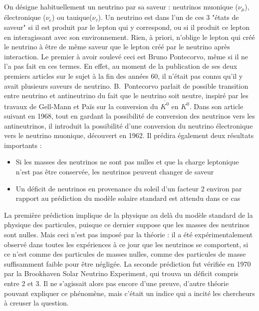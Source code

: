             On désigne habituellement un neutrino par sa saveur : neutrinos muonique ($\nu_{\mu}$), électronique ($\nu_e$) ou tauique($\nu_{\tau}$). Un neutrino est dans l'un de ces 3 "états de saveur" si il est produit par le lepton qui y correspond, ou si il produit ce lepton en interagissant avec son environnement. Rien, à priori, n'oblige le lepton qui créé le neutrino à être de même saveur que le lepton créé par le neutrino après interaction. Le premier à avoir soulevé ceci est Bruno Pontecorvo, même si il ne l'a pas fait en ces termes. En effet, au moment de la publication de ses deux premiers articles\cite{Pontecorvo:1957cp,Pontecorvo:1957qd} sur le sujet à la fin des années 60, il n'était pas connu qu'il y avait plusieurs saveurs de neutrino. B.~Pontecorvo parlait de possible transition entre neutrino et antineutrino du fait que le neutrino soit neutre, inspiré par les travaux de Gell-Mann et Païs\cite{Gell-Mann1955} sur la conversion du $\overline{K^0}$ en  $K^0$. Dans son article suivant en 1968\cite{Pontecorvo1968}, tout en gardant la possibilité de conversion des neutrinos vers les antineutrinos, il introduit la possibilité d'une conversion du neutrino électronique vers le neutrino muonique, découvert en 1962\cite{Danby1962}. Il prédira également deux résultats importants :
            \begin{itemize}
                \item Si les masses des neutrinos ne sont pas nulles et que la charge leptonique n'est pas être conservée, les neutrinos peuvent changer de saveur
                \item Un déficit de neutrinos en provenance du soleil d'un facteur 2 environ par rapport au prédiction du modèle solaire standard est attendu dans ce cas
            \end{itemize}
            La première prédiction implique de la physique au delà du modèle standard de la physique des particules, puisque ce dernier suppose que les masses des neutrinos sont nulles. Mais ceci n'est pas imposé par la théorie : il a été expérimentalement observé dans toutes les expériences à ce jour que les neutrinos se comportent, si ce n'est comme des particules de masses nulles, comme des particules de masse suffisamment faible pour être négligée. 
            La seconde prédiction fut vérifiée en 1970 par la Brookhaven Solar Neutrino Experiment\cite{Bahcall1976}, qui trouva un déficit compris entre 2 et 3. Il ne s'agissait alors pas encore d'une preuve, d'autre théorie pouvant expliquer ce phénomène, mais c'était un indice qui a incité les chercheurs à creuser la question.
            
